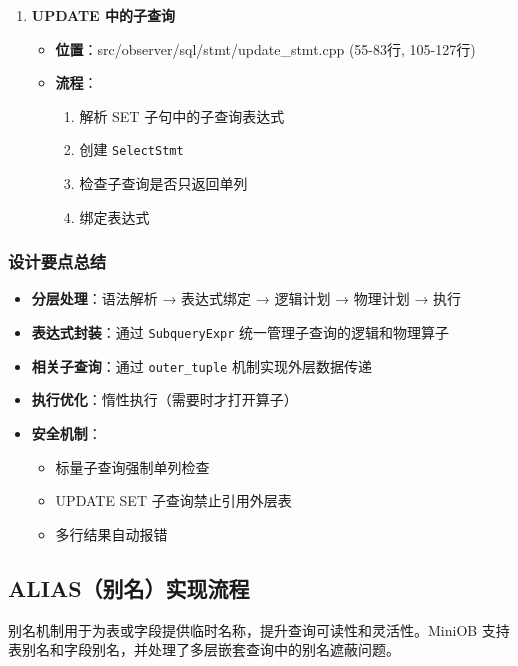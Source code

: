 \documentclass[a4paper, 12pt]{article}
\begin{document}
\begin{enumerate}
    \item \textbf{UPDATE 中的子查询}
    
\begin{itemize}
        \item \textbf{位置}：src/observer/sql/stmt/update\_stmt.cpp (55-83行, 105-127行)
        \item \textbf{流程}：
        \begin{enumerate}
            \item 解析 SET 子句中的子查询表达式
            \item 创建 \texttt{SelectStmt}
            \item 检查子查询是否只返回单列
            \item 绑定表达式
        \end{enumerate}
    \end{itemize}
\end{enumerate}

\subsubsection*{设计要点总结}
\begin{itemize}
    \item \textbf{分层处理}：语法解析 → 表达式绑定 → 逻辑计划 → 物理计划 → 执行
    \item \textbf{表达式封装}：通过 \texttt{SubqueryExpr} 统一管理子查询的逻辑和物理算子
    \item \textbf{相关子查询}：通过 \texttt{outer\_tuple} 机制实现外层数据传递
    \item \textbf{执行优化}：惰性执行（需要时才打开算子）
    \item \textbf{安全机制}：
    \begin{itemize}
        \item 标量子查询强制单列检查
        \item UPDATE SET 子查询禁止引用外层表
        \item 多行结果自动报错
    \end{itemize}
\end{itemize}

\subsection{\heiti ALIAS（别名）实现流程}
别名机制用于为表或字段提供临时名称，提升查询可读性和灵活性。MiniOB 支持表别名和字段别名，并处理了多层嵌套查询中的别名遮蔽问题。
\end{document}
